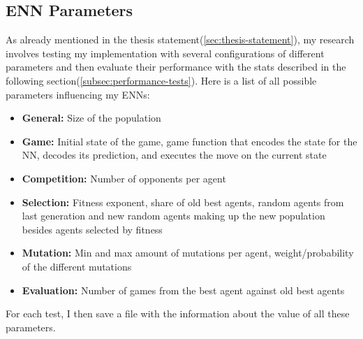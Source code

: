 \documentclass[11pt]{report}
\begin{document}
\begin{enumerate}
    \subsection{ENN Parameters}\label{subsec:enn-parameters}
    As already mentioned in the thesis statement(\ref{sec:thesis-statement}), my research involves testing my implementation with several configurations of different parameters and then evaluate their performance with the stats described in the following section(\ref{subsec:performance-tests}).
    Here is a list of all possible parameters influencing my ENNs:
    \begin{itemize}
        \item \textbf{General:} Size of the population
        \item \textbf{Game:} Initial state of the game, game function that encodes the state for the NN, decodes its prediction, and executes the move on the current state
        \item \textbf{Competition:} Number of opponents per agent
        \item \textbf{Selection:} Fitness exponent, share of old best agents, random agents from last generation and new random agents making up the new population besides agents selected by fitness
        \item \textbf{Mutation:} Min and max amount of mutations per agent, weight/probability of the different mutations
        \item \textbf{Evaluation:} Number of games from the best agent against old best agents

    \end{itemize}
    For each test, I then save a file with the information about the value of all these parameters.


\end{enumerate}
\end{document}
